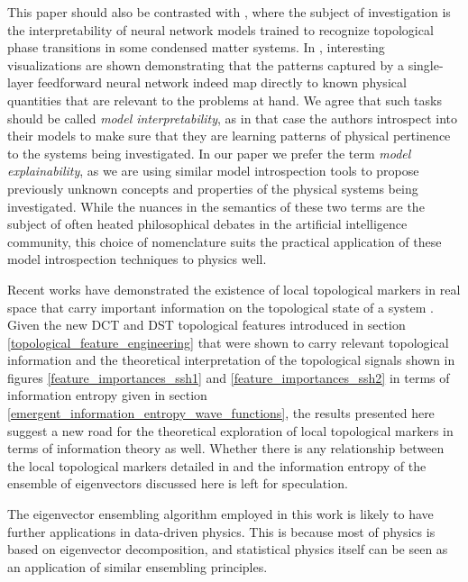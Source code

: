 \documentclass[10pt]{revtex4-1}
\begin{document}
This paper should also be contrasted with \cite{zhang2020interpreting}, where the subject of investigation is the interpretability of neural network models trained to recognize topological phase transitions in some condensed matter systems. In \cite{zhang2020interpreting}, interesting visualizations are shown demonstrating that the patterns captured by a single-layer feedforward neural network indeed map directly to known physical quantities that are relevant to the problems at hand. We agree that such tasks should be called \emph{model interpretability}, as in that case the authors introspect into their models to make sure that they are learning patterns of physical pertinence to the systems being investigated. In our paper we prefer the term \emph{model explainability}, as we are using similar model introspection tools to propose previously unknown concepts and properties of the physical systems being investigated. While the nuances in the semantics of these two terms are the subject of often heated philosophical debates in the artificial intelligence community, this choice of nomenclature suits the practical application of these model introspection techniques to physics well.

Recent works have demonstrated the existence of local topological markers in real space that carry important information on the topological state of a system \cite{PhysRevB.84.241106,caio2019topological}. Given the new DCT and DST topological features introduced in section \ref{topological_feature_engineering} that were shown to carry relevant topological information and the theoretical interpretation of the topological signals shown in figures \ref{feature_importances_ssh1} and \ref{feature_importances_ssh2} in terms of information entropy given in section \ref{emergent_information_entropy_wave_functions}, the results presented here suggest a new road for the theoretical exploration of local topological markers in terms of information theory as well. Whether there is any relationship between the local topological markers detailed in \cite{PhysRevB.84.241106,caio2019topological} and the information entropy of the ensemble of eigenvectors discussed here is left for speculation.
 
The eigenvector ensembling algorithm employed in this work is likely to have further applications in data-driven physics. This is because most of physics is based on eigenvector decomposition, and statistical physics itself can be seen as an application of similar ensembling principles. 
\end{document}
